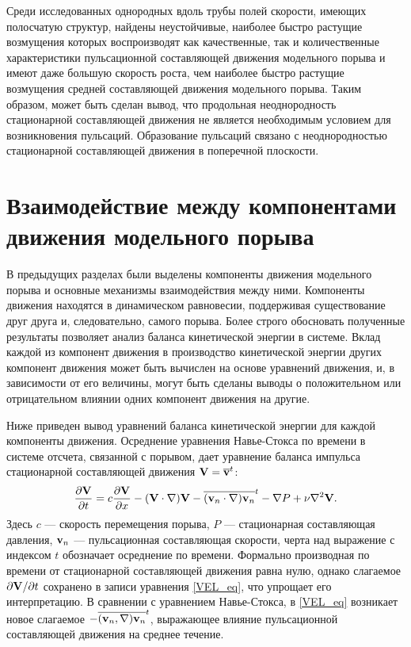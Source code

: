 Среди исследованных однородных вдоль трубы полей скорости, имеющих полосчатую структур, найдены неустойчивые, наиболее быстро растущие возмущения которых воспроизводят как качественные, так и количественные характеристики пульсационной составляющей движения модельного порыва и имеют даже большую скорость роста, чем наиболее быстро растущие возмущения средней составляющей движения модельного порыва. Таким образом, может быть сделан вывод, что продольная неоднородность стационарной составляющей движения не является необходимым условием для возникновения пульсаций. Образование пульсаций связано с неоднородностью стационарной составляющей движения в поперечной плоскости. 


\section{Взаимодействие между компонентами движения модельного порыва}

В предыдущих разделах были выделены компоненты движения модельного порыва и основные механизмы взаимодействия между ними. Компоненты движения находятся в динамическом равновесии, поддерживая существование друг друга и, следовательно, самого порыва. Более строго обосновать полученные результаты позволяет анализ баланса кинетической энергии в системе. Вклад каждой из компонент движения в производство кинетической энергии других компонент движения может быть вычислен на основе уравнений движения, и, в зависимости от его величины, могут быть сделаны выводы о положительном или отрицательном влиянии одних компонент движения на другие. 

Ниже приведен вывод уравнений баланса кинетической энергии для каждой компоненты движения. 
Осреднение уравнения Навье-Стокса по времени в системе отсчета, связанной с порывом, дает уравнение баланса импульса стационарной составляющей движения $\mathbf{V} = \overline{\mathbf{v}}^t$:
\begin{equation} \label{VEL_eq}
\frac{\partial \mathbf{V}}{\partial t} = c \frac{\partial \mathbf{V}}{\partial x} - (\mathbf{V} \cdot \nabla) \mathbf{V} - \overline{(\mathbf{v}_n \cdot \nabla) \mathbf{v}_n}^t - \nabla P + \nu \nabla^2 \mathbf{V}.
\end{equation}
Здесь $c$ --- скорость перемещения порыва, $P$ --- стационарная составляющая давления, $\mathbf{v}_n$ --- пульсационная составляющая скорости, черта над выражение с индексом $t$ обозначает осреднение по времени. Формально производная по времени от стационарной составляющей движения равна нулю, однако слагаемое $\partial \mathbf{V}/ \partial t$ сохранено в записи уравнения \eqref{VEL_eq}, что упрощает его интерпретацию. В сравнении с уравнением Навье-Стокса, в \eqref{VEL_eq} возникает новое слагаемое $-\overline{(\mathbf{v}_n, \nabla) \mathbf{v}_n}^t$, выражающее влияние пульсационной составляющей движения на среднее течение. 

